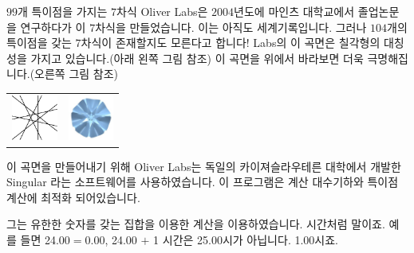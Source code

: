\begin{surferPage}{$99$개 특이점을 가지는 $7$차식}
    Oliver Labs은 $2004$년도에 마인츠 대학교에서 졸업논문을 연구하다가 이 $7$차식을 만들었습니다. 이는 아직도 세계기록입니다. 그러나 $104$개의 특이점을 갖는 $7$차식이 존재할지도 모른다고 합니다! Labs의 이 곡면은 칠각형의 대칭성을 가지고 있습니다.(아래 왼쪽 그림 참조) 이 곡면을 위에서 바라보면 더욱 극명해집니다.(오른쪽 그림 참조) 

    \vspace*{-0.3em}
    \begin{center}
      \begin{tabular}{c@{\qquad}c}
        \includegraphics[height=1.5cm]{./../../common/images/labsseptic1.pdf}
        &
        \includegraphics[height=1.5cm]{./../../common/images/labs_septic_von_oben}
      \end{tabular}
    \end{center}
    \vspace*{-0.3em}

이 곡면을 만들어내기 위해 Oliver Labs는 독일의 카이져슬라우테른 대학에서 개발한 {\sc Singular} 라는 소프트웨어를 사용하였습니다. 이 프로그램은 계산 대수기하와 특이점 계산에 최적화 되어있습니다. 

그는 유한한 숫자를 갖는 집합을 이용한 계산을 이용하였습니다. 시간처럼 말이죠. 예를 들면 24.00$=$0.00, 24.00 $+$ 1 시간은 25.00시가 아닙니다. 1.00시죠.
\end{surferPage}
